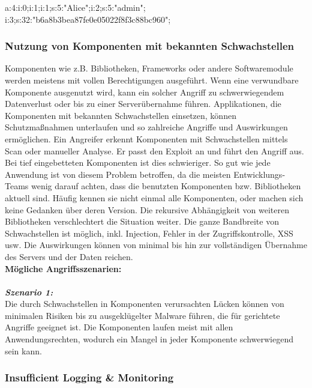 \begin{LaTeXCode}[caption={Unsichere Deserialisierung - Beispiel 3},captionpos=b, label=LaTeXCode:ud3][numbers=none]
a:4:{i:0;i:1;i:1;s:5:"Alice";i:2;s:5:"admin";
i:3;s:32:"b6a8b3bea87fe0e05022f8f3c88bc960";}
\end{LaTeXCode}

\subsubsection{Nutzung von Komponenten mit bekannten Schwachstellen}

Komponenten wie z.B. Bibliotheken, Frameworks oder andere Softwaremodule werden meistens mit vollen Berechtigungen ausgeführt. Wenn eine verwundbare Komponente ausgenutzt wird, kann ein solcher Angriff zu schwerwiegendem Datenverlust oder bis zu einer Serverübernahme führen. Applikationen, die Komponenten mit bekannten Schwachstellen einsetzen, können Schutzmaßnahmen unterlaufen und so zahlreiche Angriffe und Auswirkungen ermöglichen\cite[6]{owasp17top10}. Ein Angreifer erkennt Komponenten mit Schwachstellen mittels Scan oder manueller Analyse. Er passt den Exploit an und führt den Angriff aus. Bei tief eingebetteten Komponenten ist dies schwieriger. So gut wie jede Anwendung ist von diesem Problem betroffen, da die meisten Entwicklungs-Teams wenig darauf achten, dass die benutzten Komponenten bzw. Bibliotheken aktuell sind. Häufig kennen sie nicht einmal alle Komponenten, oder machen sich keine Gedanken über deren Version. Die rekursive Abhängigkeit von weiteren Bibliotheken verschlechtert die Situation weiter. Die ganze Bandbreite von Schwachstellen ist möglich, inkl. Injection, Fehler in der Zugriffskontrolle, XSS usw. Die Auswirkungen können von minimal bis hin zur vollständigen Übernahme
des Servers und der Daten reichen\cite[15]{owasp17top10}.\\

\textbf{Mögliche Angriffsszenarien:}\\
\\
\textbf{\textit{Szenario 1:}}\\
Die durch Schwachstellen in Komponenten verursachten
Lücken können von minimalen Risiken bis zu ausgeklügelter Malware führen, die für gerichtete Angriffe geeignet ist. Die Komponenten laufen meist mit allen Anwendungsrechten, wodurch ein Mangel in jeder Komponente schwerwiegend sein kann\cite[15]{owasp17top10}.

\subsubsection{Insufficient Logging \& Monitoring}

